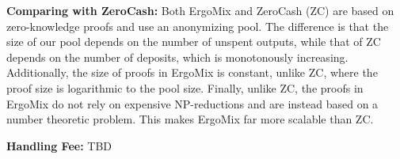 \documentclass[11pt]{article}
\newcommand{\authnote}[2]{\marginpar{\parbox{\marginparwidth}{\tiny %
  \textsf{#1 {\textcolor{blue}{notes: #2}}}}}%
  \textcolor{blue}{\textbf{\dag}}}
\newcommand{\authnote}[2]{
  \textsf{#1 \textcolor{blue}{: #2}}}
\newcommand{\authnote}[2]{}
\newcommand{\snote}[1]{{\authnote{\textcolor{yellow}{Scalahub notes}}{#1}}}
\newcommand{\mixname}{ErgoMix\xspace}
\begin{document}
\textbf{Comparing with ZeroCash:} Both \mixname and ZeroCash (ZC) are based on zero-knowledge proofs and use an anonymizing pool. The difference is that the size of our pool depends on the number of unspent outputs, while that of ZC depends on the number of deposits, which is monotonously increasing. Additionally, the size of proofs in \mixname is constant, unlike ZC, where the proof size is logarithmic to the pool size. Finally, unlike ZC, the proofs in \mixname do not rely on expensive NP-reductions and are instead based on a number theoretic problem. This makes \mixname far more scalable than ZC. 

\textbf{Handling Fee:} TBD




\end{document}
